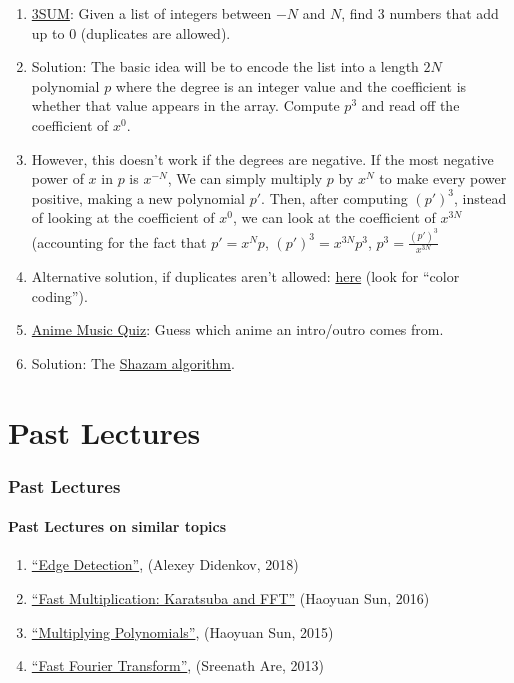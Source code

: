 \documentclass{beamer}                             %
\begin{document}
\begin{frame}
\begin{enumerate}
  \item \href{https://en.wikipedia.org/wiki/3SUM}{3SUM}:
    Given a list of integers between \( -N \) and \( N \),
    find 3 numbers that add up to 0 (duplicates are allowed). 
    \addtocounter{enumi}{-1}
  \item Solution: The basic idea will be to encode the list into a length \( 2N \)
    polynomial \( p \) where the degree is an integer value and the coefficient
    is whether that value appears in the array.
    Compute \( p^3 \) and read off the coefficient of \( x^0 \).
    \addtocounter{enumi}{-1}
  \item However, this doesn't work if the degrees are negative. If the most
    negative power of \( x \) in \( p \) is \( x^{-N} \), We can simply multiply
    \( p \) by \( x^N \) to make every power positive, making a new polynomial
    \( p' \). Then, after computing \( (p')^3 \), instead of looking at the
    coefficient of \( x^0 \), we can look at the coefficient of \( x^{3N} \)
    (accounting for the fact that \( p' = x^N p \), \( (p')^3 = x^{3N} p^3 \),
    \( p^3 = \frac{(p')^3}{x^{3N}} \)
    \addtocounter{enumi}{-1}
  \item Alternative solution, if duplicates aren't allowed:
    \href{https://cs.stanford.edu/~rishig/courses/ref/l16.txt}{here}
    (look for \enquote{color coding}).

  \item \href{https://animemusicquiz.com/}{Anime Music Quiz}:
    Guess which anime an intro/outro comes from.
    \addtocounter{enumi}{-1}
  \item Solution: The \href{https://www.toptal.com/algorithms/shazam-it-music-processing-fingerprinting-and-recognition}
    {Shazam algorithm}.
\end{enumerate}
\end{frame}

\section{Past Lectures}

\begin{frame}
\frametitle{Past Lectures}
\framesubtitle{Past Lectures on similar topics}
\begin{enumerate}
  \item \href{https://activities.tjhsst.edu/computervision/lectures/Edge_Detection.pdf}
    {\enquote{Edge Detection}}, (Alexey Didenkov, 2018)
  \item \href{https://activities.tjhsst.edu/sct/lectures/1516/SCT_Polynomial.pdf}
    {\enquote{Fast Multiplication: Karatsuba and FFT}} (Haoyuan Sun, 2016)
  \item \href{https://activities.tjhsst.edu/sct/lectures/1415/SCT_Multiplying_Polynomials.pdf}
    {\enquote{Multiplying Polynomials}}, (Haoyuan Sun, 2015)
  \item \href{https://activities.tjhsst.edu/sct/lectures/1213/fft.pdf}
    {\enquote{Fast Fourier Transform}}, (Sreenath Are, 2013)
\end{enumerate}
\end{frame}
\end{document}
